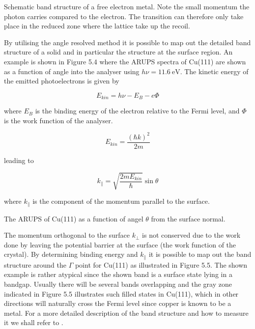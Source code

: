 \vspace*{11cm}

           Schematic band structure of a free electron metal. Note the small momentum the photon carries compared to the electron. The transition can therefore only take place in the reduced zone where the lattice take up the recoil.

\vspace{1cm}

By utilising the angle resolved method it is possible to map out the detailed band structure of a solid and in particular the structure at the surface region. An example is shown in Figure 5.4 where the ARUPS spectra of Cu(111) are shown as a function of angle into the analyser using $h\nu=\SI{11.6}{\electronvolt}$.  The kinetic energy of the emitted  photoelectrons is given by

\begin{equation}
E_{kin}=h\nu-E_B-e\Phi
\end{equation}

where $E_B$ is the binding energy of the electron relative to the Fermi level, and $\Phi$ is the work function of the analyser.

\begin{equation}
E_{kin}=\frac{(\hbar k)^2}{2m}
\end{equation}

leading to 

\begin{equation}
k_\parallel=\sqrt{\frac{2mE_{kin}}{\hbar}}\sin \theta
\end{equation}

where $k_\parallel$  is the component of the momentum parallel to the surface.

\vspace*{11cm}

           The ARUPS of Cu(111) as a function of angel $\theta$ from the surface normal.

\vspace{1cm}

The momentum orthogonal to the surface $k_{\perp}$ is not conserved due to the work done by leaving the potential barrier at the surface (the work function of the crystal). By determining binding energy and $k_\parallel$ it is possible to map out the band structure around the $\Gamma$ point for Cu(111) as illustrated in Figure 5.5. The shown example is rather atypical since the shown band is a surface state lying in a bandgap. Usually there will be several bands overlapping and the gray zone indicated in Figure 5.5 illustrates such  filled states in Cu(111), which in other directions will naturally cross the Fermi level since copper is known to be a metal. For a more detailed description of the band structure and how to measure it  we shall refer to \cite{Neddermeyer, Kevan}.

